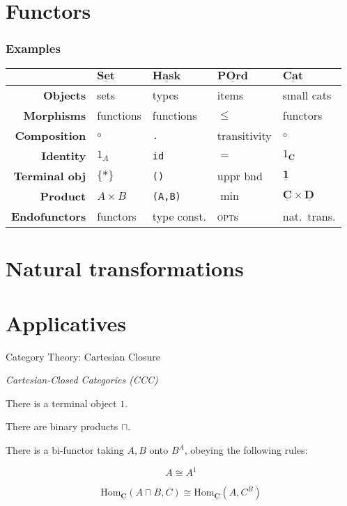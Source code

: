 \documentclass[10pt]{beamer}
\newcommand{\Cat}[1]{\ensuremath{\underline{\mathbf{#1}}}}
\newcommand{\Hom}[3]{\ensuremath{\mathrm{Hom}_{\Cat{#1}}(#2,#3)}}
\newcommand{\Com}[3]{#3^{#2}}
\newcommand{\eqnlabel}[1]{\label{eq:#1}}
\theoremstyle{definition}
\theoremstyle{remark}
\numberwithin{equation}{section}
\begin{document}
\section{Functors}

\begin{frame}[fragile]
  \frametitle{Examples}
  \begin{tabular}{r l l l l}\toprule
    & $\Cat{Set}$ & $\Cat{Hask}$ & $\Cat{POrd}$ & $\Cat{Cat}$ \\\midrule
    \textbf{Objects} & sets & types & items & small cats \\
    \textbf{Morphisms} & functions & functions & $\leq$ & functors \\
    \textbf{Composition} & $\circ$ & \texttt{.} & transitivity & $\circ$ \\
    \textbf{Identity} & $1_A$ & \texttt{id} & $=$ & $1_{\Cat{C}}$ \\
    \textbf{Terminal obj\rlap{.}} & $\{*\}$ & \texttt{()} & uppr bnd & $\Cat{1}$ \\
    \textbf{Product} & $A \times B$ & \texttt{(A,B)} & $\min$ & $\Cat{C} \times \Cat{D}$ \\
    \textbf{Endofunctors} & functors & type const. & \textsc{opt}s & nat.\ trans.\\\bottomrule
  \end{tabular}
\end{frame}

\section{Natural transformations}

\section{Applicatives}

\begin{frame}[fragile]{Category Theory: Cartesian Closure}

  \emph{Cartesian-Closed Categories (CCC)}

  There is a terminal object $1$.

  There are binary products $\sqcap$.

  There is a bi-functor taking $A,B$ onto $\Com{C}{A}{B}$, obeying the following rules:
  
  \[
  A \cong \Com{C}{1}{A}
  \]
  
  \begin{equation}
  \Hom{C}{A\sqcap B}{C} \cong \Hom{C}{A}{\Com{C}{B}{C}} \eqnlabel{exp1}
  \end{equation}
\end{frame}
\end{document}
